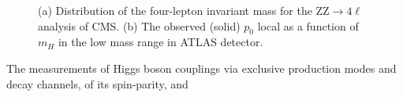 \begin{figure}
\centering%
\caption{(a) Distribution of the four-lepton invariant mass for the ZZ$\to 4 \ell$ analysis of CMS.  (b) The observed (solid) $p_0$ local as a function of $m_H$ in the low mass range in ATLAS detector. }
\label{disc_hig}
\end{figure}
The measurements of Higgs boson couplings via exclusive production modes and decay channels, of its spin-parity, and
